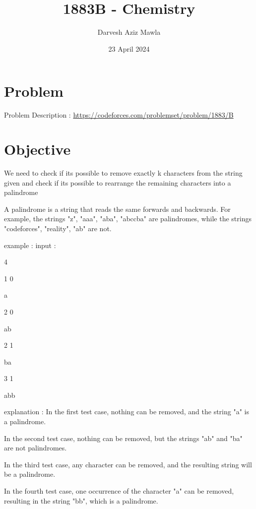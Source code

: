 \documentclass{article}
\title{1883B - Chemistry}
\author{Darvesh Aziz Mawla}
\date{23 April 2024}
\begin{document}
\maketitle


\section{Problem}

Problem Description : \href{https://codeforces.com/problemset/problem/1883/B}{https://codeforces.com/problemset/problem/1883/B}

\section{Objective}

We need to check if its possible to remove exactly k characters from the string given and check if its possible to rearrange the remaining characters into a palindrome

A palindrome is a string that reads the same forwards and backwards. For example, the strings "z", "aaa", "aba", "abccba" are palindromes, while the strings "codeforces", "reality", "ab" are not.

example :
input :

4

1 0

a

2 0

ab

2 1

ba

3 1

abb

explanation :
In the first test case, nothing can be removed, and the string "a" is a palindrome.

In the second test case, nothing can be removed, but the strings "ab" and "ba" are not palindromes.

In the third test case, any character can be removed, and the resulting string will be a palindrome.

In the fourth test case, one occurrence of the character "a" can be removed, resulting in the string "bb", which is a palindrome.


\end{document}
